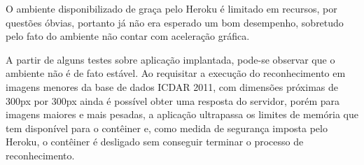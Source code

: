 O ambiente disponibilizado de graça pelo Heroku é limitado em recursos, por questões óbvias, portanto já não era esperado 
um bom desempenho, sobretudo pelo fato do ambiente não contar com aceleração gráfica.

A partir de alguns testes sobre aplicação implantada, pode-se observar que o ambiente não é de fato estável. 
Ao requisitar a execução do reconhecimento em imagens menores da base de dados ICDAR 2011, com dimensões próximas de 300px por 300px 
ainda é possível obter uma resposta do servidor, porém para imagens maiores e mais pesadas, a aplicação ultrapassa os limites de 
memória que tem disponível para o contêiner e, como medida de segurança imposta pelo Heroku, o contêiner é desligado sem conseguir 
terminar o processo de reconhecimento.